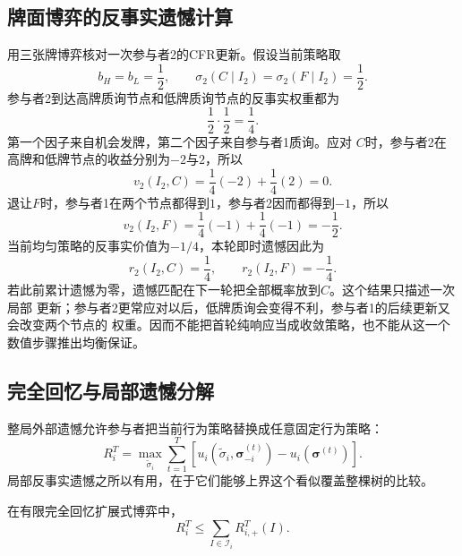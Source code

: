 \subsection{牌面博弈的反事实遗憾计算}

用三张牌博弈核对一次参与者2的CFR更新。假设当前策略取
\[
  b_H=b_L=\frac12,\qquad
  \sigma_2(C\mid I_2)=\sigma_2(F\mid I_2)=\frac12.
\]
参与者2到达高牌质询节点和低牌质询节点的反事实权重都为
\[
  \frac12\cdot\frac12=\frac14.
\]
第一个因子来自机会发牌，第二个因子来自参与者1质询。应对
\(C\)时，参与者2在高牌和低牌节点的收益分别为\(-2\)与\(2\)，所以
\[
  v_2(I_2,C)
  =
  \frac14(-2)+\frac14(2)=0.
\]
退让\(F\)时，参与者1在两个节点都得到\(1\)，参与者2因而都得到\(-1\)，所以
\[
  v_2(I_2,F)
  =
  \frac14(-1)+\frac14(-1)=-\frac12.
\]
当前均匀策略的反事实价值为\(-1/4\)，本轮即时遗憾因此为
\[
  r_2(I_2,C)=\frac14,\qquad
  r_2(I_2,F)=-\frac14.
\]
若此前累计遗憾为零，遗憾匹配在下一轮把全部概率放到\(C\)。这个结果只描述一次局部
更新；参与者2更常应对以后，低牌质询会变得不利，参与者1的后续更新又会改变两个节点的
权重。因而不能把首轮纯响应当成收敛策略，也不能从这一个数值步骤推出均衡保证。

\subsection{完全回忆与局部遗憾分解}

整局外部遗憾允许参与者把当前行为策略替换成任意固定行为策略：
\begin{equation}
  R_i^T
  =
  \max_{\widetilde{\sigma}_i}
  \sum_{t=1}^{T}
  \left[
    u_i(\widetilde{\sigma}_i,\bm{\sigma}_{-i}^{(t)})
    -
    u_i(\bm{\sigma}^{(t)})
  \right].
  \label{eq:game-extensive-external-regret}
\end{equation}
局部反事实遗憾之所以有用，在于它们能够上界这个看似覆盖整棵树的比较。

\begin{theorem}[CFR的反事实遗憾分解]
\label{thm:game-cfr-decomposition}
在有限完全回忆扩展式博弈中，
\begin{equation}
  R_i^T
  \leq
  \sum_{I\in\mathcal{I}_i}
  R_{i,+}^T(I).
  \label{eq:game-cfr-global-bound}
\end{equation}
\end{theorem}

